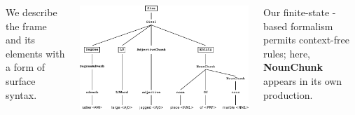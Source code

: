 \documentclass[25pt, a0papper, portrait]{tikzposter}
\begin{document}
\begin{columns}
{      We describe the frame and its elements with a form of surface syntax.

      \vspace{2cm}
\begin{center}
  \includegraphics[width=32cm]{images/tagged_tree1.pdf}
  \end{center}
      

      \vspace{2cm}

      Our finite-state -based formalism permits context-free rules; here, \textbf{NounChunk} appears in its own production.


}
\end{columns}
\end{document}
